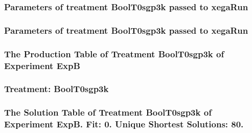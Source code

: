 \documentclass[18pt,c]{beamer}
\begin{document}

 \begin{frame}
 \fontsize{8pt}{9pt}\selectfont
 \frametitle{  Parameters of treatment BoolT0sgp3k passed to xegaRun
 }

 \label{ExpBtParmTable006.tex}  
 \end{frame}


 \begin{frame}
 \fontsize{8pt}{9pt}\selectfont
 \frametitle{  Parameters of treatment BoolT0sgp3k passed to xegaRun
 }

 \label{ExpBtParmTable007.tex}  
 \end{frame}

 \begin{frame}
 \fontsize{8pt}{9pt}\selectfont
 \frametitle{ The Production Table of Treatment BoolT0sgp3k of Experiment ExpB }

 \label{ExpBGrammarTable001.tex}  
 \end{frame}

 \begin{frame}
 \fontsize{8pt}{9pt}\selectfont
 \frametitle{ Treatment: BoolT0sgp3k }

 \label{ExpBStatsTable008.tex}  
 \end{frame}

 \begin{frame}
 \fontsize{8pt}{9pt}\selectfont
 \frametitle{ The Solution Table of Treatment BoolT0sgp3k of Experiment ExpB. Fit: 0. Unique Shortest Solutions: 80. }

 \label{ExpBSolutionTable001.tex}  
 \end{frame}
\end{document}
